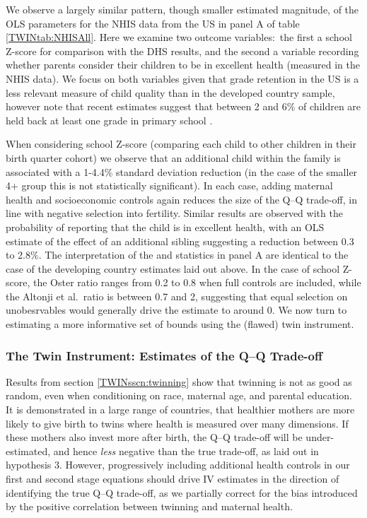 \documentclass[subeqn]{article}
\begin{document}
\begin{spacing}{1.4}
We observe a largely similar pattern, though smaller estimated magnitude, of
the OLS parameters for the NHIS data from the US in panel A of table
\ref{TWINtab:NHISAll}.  Here we examine two outcome variables:\ the first a
school Z-score for comparison with the DHS results, and the second a variable
recording whether parents consider their children to be in excellent health
(measured in the NHIS data).  We focus on both variables given that grade
retention in the US is a less relevant measure of child quality than in the
developed country sample, however note that recent estimates suggest that
between 2 and 6\% of children are held back at least one grade in primary
school \citep{Warrenetal2014}.

When considering school Z-score (comparing each child to other children in their
birth quarter cohort) we observe that an additional child within the family is
associated with a 1-4.4\% standard deviation reduction (in the case of the
smaller 4+ group this is not statistically significant).  In each case, adding
maternal health and socioeconomic controls again reduces the size of the Q--Q
trade-off, in line with negative selection into fertility.  Similar results are
observed with the probability of reporting that the child is in excellent
health, with an OLS estimate of the effect of an additional sibling suggesting
a reduction between 0.3 to 2.8\%.  The interpretation of the
\citeauthor{Altonjietal2005} and \citeauthor{Oster2013} statistics in panel A
are identical to the case of the developing country estimates laid out above.
In the case of school Z-score, the Oster ratio ranges from 0.2 to 0.8 when full
controls are included, while the Altonji et al.\ ratio is between 0.7 and 2,
suggesting that equal selection on unobesrvables would generally drive the
estimate to around 0.  We now turn to estimating a more informative set of
bounds using the (flawed) twin instrument.

\subsubsection{The Twin Instrument: Estimates of the Q--Q Trade-off}
Results from section \ref{TWINsscn:twinning} show that twinning is not as good
as random, even when conditioning on race, maternal age, and parental education. 
It is demonstrated in a large range of countries, that healthier mothers are 
more likely to give birth to twins where health is measured over many
dimensions. If these mothers also invest more after birth, the Q--Q trade-off
will be under-estimated, and hence \emph{less} negative than the true trade-off,
as laid out in hypothesis 3.  However, progressively including additional
health controls in our first and second stage equations should drive IV
estimates in the direction of identifying the true Q--Q trade-off, as we
partially correct for the bias introduced by the positive correlation between
twinning and maternal health.


\end{spacing}
\end{document}

